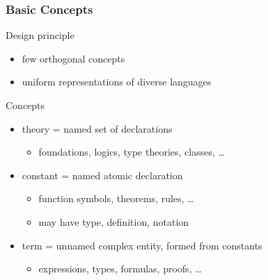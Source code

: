 \documentclass{beamer}
\begin{document}


\begin{frame}\frametitle{Basic Concepts}
Design principle
 \begin{itemize}
   \item few orthogonal concepts
   \item uniform representations of diverse languages
 \end{itemize}

Concepts
\begin{itemize}
  \item theory = named set of declarations\\
    \begin{itemize}
     \item \footnotesize foundations, logics, type theories, classes, \ldots
    \end{itemize}
  \item constant = named atomic declaration\\
    \begin{itemize}
      \item \footnotesize function symbols, theorems, rules, \ldots
      \item \footnotesize may have type, definition, notation
    \end{itemize}
  \item term = unnamed complex entity, formed from constants\\
     \begin{itemize}
       \item \footnotesize expressions, types, formulas, proofs, \ldots
     \end{itemize}
\end{itemize}
\end{frame}
\end{document}

